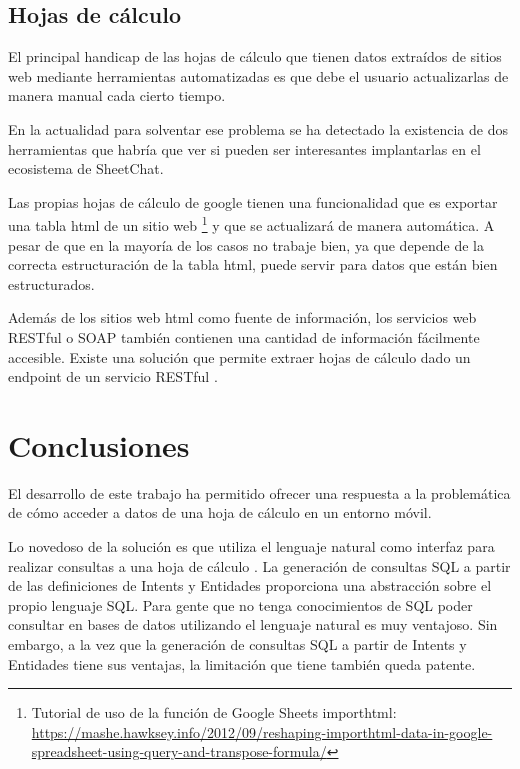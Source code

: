 \subsection{Hojas de cálculo}

El principal handicap de las hojas de cálculo que tienen datos extraídos de sitios web mediante herramientas automatizadas es que debe el usuario actualizarlas de manera manual cada cierto tiempo.

En la actualidad para solventar ese problema se ha detectado la existencia de dos herramientas que habría que ver si pueden ser interesantes implantarlas en el ecosistema de SheetChat.

Las propias hojas de cálculo de google tienen una funcionalidad que es exportar una tabla html de un sitio web \footnote{Tutorial de uso de la función de Google Sheets importhtml: \url{https://mashe.hawksey.info/2012/09/reshaping-importhtml-data-in-google-spreadsheet-using-query-and-transpose-formula/}} y que se actualizará de manera automática. A pesar de que en la mayoría de los casos no trabaje bien, ya que depende de la correcta estructuración de la tabla html, puede servir para datos que están bien estructurados.

Además de los sitios web html como fuente de información, los servicios web RESTful o SOAP también contienen una cantidad de información fácilmente accesible. Existe una solución que permite extraer hojas de cálculo dado un endpoint de un servicio RESTful \cite{Chang2014}.

\section{Conclusiones}
\label{sec:Conclusions}

El desarrollo de este trabajo ha permitido ofrecer una respuesta a la problemática de cómo acceder a datos de una hoja de cálculo en un entorno móvil.

Lo novedoso de la solución es que utiliza el lenguaje natural como interfaz para realizar consultas a una hoja de cálculo \cite{Flood2010}. La generación de consultas SQL a partir de las definiciones de Intents y Entidades proporciona una abstracción sobre el propio lenguaje SQL. Para gente que no tenga conocimientos de SQL poder consultar en bases de datos utilizando el lenguaje natural es muy ventajoso. Sin embargo, a la vez que la generación de consultas SQL a partir de Intents y Entidades tiene sus ventajas, la limitación que tiene también queda patente.

